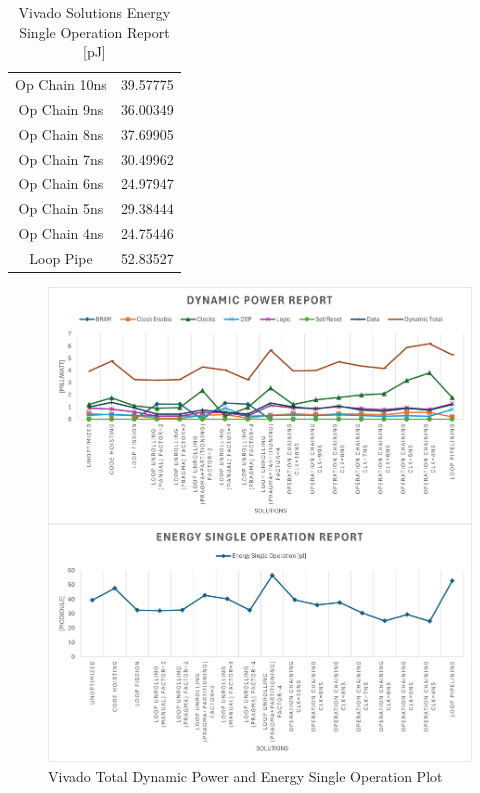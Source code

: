 \begin{table}[H]
\begin{minipage}[t]{0.45\linewidth}
\begin{tabular}{|c|c|}
			Op Chain 10ns & 39.57775 \\
			Op Chain 9ns & 36.00349 \\
			Op Chain 8ns & 37.69905 \\
			Op Chain 7ns & 30.49962 \\
			Op Chain 6ns & 24.97947 \\
			Op Chain 5ns & 29.38444 \\
			Op Chain 4ns & 24.75446 \\
			Loop Pipe & 52.83527 \\
			\hline
		\end{tabular}
		\caption{Vivado Solutions Energy Single Operation Report [pJ]}
		\label{tab:vivado-solutions-energy-single-operation-report}
	\end{minipage}
\end{table}

\begin{figure}[H]
	\centering
	\includegraphics[width=0.7\textheight]{conclusions/powerreport.png}
	\caption{Vivado Total Dynamic Power and Energy Single Operation Plot}
	\label{fig:vivado-solutions-power-plot}
\end{figure}

